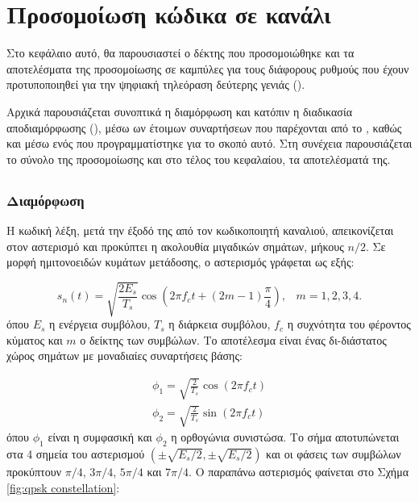 \chapter{Προσομοίωση  κώδικα σε κανάλι }
Στο κεφάλαιο αυτό, θα παρουσιαστεί ο δέκτης που προσομοιώθηκε και τα αποτελέσματα της προσομοίωσης σε καμπύλες  για τους διάφορους ρυθμούς που έχουν προτυποποιηθεί για την ψηφιακή τηλεόραση δεύτερης γενιάς ().

Αρχικά παρουσιάζεται συνοπτικά η διαμόρφωση  και κατόπιν η διαδικασία αποδιαμόρφωσης (), μέσω ων έτοιμων συναρτήσεων που παρέχονται από το , καθώς και μέσω ενός  που προγραμματίστηκε για το σκοπό αυτό. Στη συνέχεια παρουσιάζεται το σύνολο της προσομοίωσης και στο τέλος του κεφαλαίου, τα αποτελέσματά της.

\section{}
\subsection{Διαμόρφωση }
Η κωδική λέξη, μετά την έξοδό της από τον κωδικοποιητή καναλιού, απεικονίζεται στον  αστερισμό και προκύπτει η ακολουθία μιγαδικών σημάτων, μήκους $n/2$. Σε μορφή ημιτονοειδών κυμάτων μετάδοσης, ο  αστερισμός γράφεται ως εξής:

\begin{equation}
s_n(t)=\sqrt{\frac{2E_s}{T_s}}\cos\left(2{\pi}f_ct+(2m-1)\frac{\pi}{4}\right),\;\;\;m=1,2,3,4.
\label{eq:QPSK sinusoid waves}
\end{equation}
όπου $E_s$ η ενέργεια συμβόλου, $T_s$ η διάρκεια συμβόλου, $f_c$ η συχνότητα του φέροντος κύματος και $m$ ο δείκτης των συμβώλων. Το αποτέλεσμα είναι ένας δι-διάστατος χώρος σημάτων με μοναδιαίες συναρτήσεις βάσης:

\begin{equation}
\begin{aligned}
\phi_1=\sqrt{\frac{2}{T_s}}\cos(2{\pi}f_ct) \\ \phi_2=\sqrt{\frac{2}{T_s}}\sin(2{\pi}f_ct)
\end{aligned}
\label{eq:QPSK base functions}
\end{equation}
όπου $\phi_1$ είναι η συμφασική και $\phi_2$ η ορθογώνια συνιστώσα. Το σήμα αποτυπώνεται στα 4 σημεία του αστερισμού  $\left(\pm\sqrt{E_s/2},\pm\sqrt{E_s/2}\right)$ και οι φάσεις των συμβώλων προκύπτουν $\pi/4$, $3\pi/4$, $5\pi/4$ και $7\pi/4$. Ο παραπάνω αστερισμός φαίνεται στο Σχήμα \ref{fig:qpsk constellation}:

